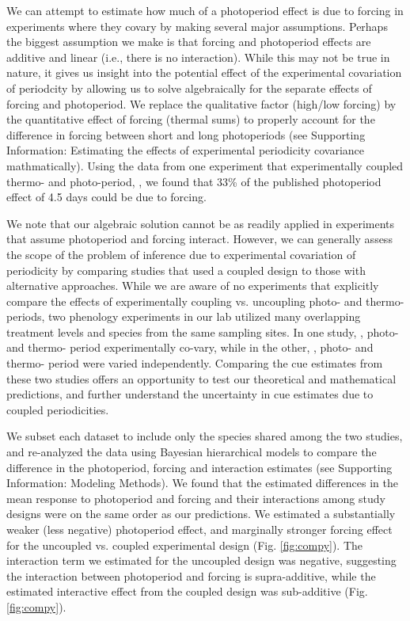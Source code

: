 \documentclass[11pt]{article}
\begin{document}
We can attempt to estimate how much of a photoperiod effect is due to forcing in experiments where they covary by making several major assumptions. Perhaps the biggest assumption we make is that forcing and photoperiod effects are additive and linear (i.e., there is no interaction). While this may not be true in nature, it gives us insight into the potential effect of the experimental covariation of periodcity by allowing us to solve algebraically for the separate effects of forcing and photoperiod. We replace the qualitative factor (high/low forcing) by the quantitative effect of forcing (thermal sums) to properly account for the difference in forcing between short and long photoperiods (see Supporting Information: Estimating the effects of experimental periodicity covariance mathmatically). Using the data from one experiment that experimentally coupled thermo- and photo-period, \citet{Flynn2018}, we found that 33\% of the published photoperiod effect of 4.5 days could be due to forcing. 

We note that our algebraic solution cannot be as readily applied in experiments that assume photoperiod and forcing interact. However, we can generally assess the scope of the problem of inference due to experimental covariation of periodicity by comparing studies that used a coupled design to those with alternative approaches. While we are aware of no experiments that explicitly compare the effects of experimentally coupling vs. uncoupling photo- and thermo- periods, two phenology experiments in our lab utilized many overlapping treatment levels and species from the same sampling sites. In one study, \citet{Flynn2018}, photo- and thermo- period experimentally co-vary, while in the other, \citet{Buonaiuto:2021ug},  photo- and thermo- period were varied independently. Comparing the cue estimates from these two studies offers an opportunity to test our theoretical and mathematical predictions, and further understand the uncertainty in cue estimates due to coupled periodicities.

We subset each dataset to include only the species shared among the two studies, and re-analyzed the data using Bayesian hierarchical models to compare the difference in the photoperiod, forcing and interaction estimates (see Supporting Information: Modeling Methods). We found that the estimated differences in the mean response to photoperiod and forcing and their interactions among study designs were on the same order as our predictions. We estimated a substantially weaker (less negative) photoperiod effect, and marginally stronger forcing effect for the uncoupled vs. coupled experimental design (Fig. \ref{fig:compy}). The interaction term we estimated for the uncoupled design was negative, suggesting the interaction between photoperiod and forcing is supra-additive, while the estimated interactive effect from the coupled design was sub-additive (Fig. \ref{fig:compy}).
\end{document}
